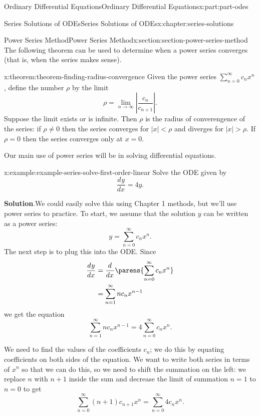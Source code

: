 \documentclass[oneside,10pt,]{book}
\newcommand{\blocktitlefont}{\relax}
\numberwithin{equation}{part}
\newcommand{\dv}[3][]{\dfrac{d^{#1} #2}{d #3^{#1}}}
\newcommand{\limit}[2]{\lim_{#1\to#2}}
\newcommand{\lt}{<}
\newcommand{\gt}{>}
\newcommand{\amp}{&}
\begin{document}
\begin{partptx}{Ordinary Differential Equations}{}{Ordinary Differential Equations}{}{}{x:part:part-odes}
\begin{chapterptx}{Series Solutions of ODEs}{}{Series Solutions of ODEs}{}{}{x:chapter:series-solutions}
\begin{sectionptx}{Power Series Method}{}{Power Series Method}{}{}{x:section:section-power-series-method}
The following theorem can be used to determine when a power series converges (that is, when the series makes sense).%
\begin{theorem}{}{}{x:theorem:theorem-finding-radius-convergence}%
Given the power series \(\sum_{n=0}^{\infty}c_{n}x^{n}\), define the number \(\rho\) by the limit%
\begin{equation*}
\rho = \limit{n}{\infty}\left|\frac{c_{n}}{c_{n+1}}\right|.
\end{equation*}
Suppose the limit exists or is infinite. Then \(\rho\) is the radius of converengence of the series: if \(\rho\neq0\) then the series converges for \(|x|\lt\rho\) and diverges for \(|x|\gt\rho\). If \(\rho=0\) then the series converges only at \(x=0\).%
\end{theorem}
Our main use of power series will be in solving differential equations.%
\begin{example}{}{x:example:example-series-solve-first-order-linear}%
Solve the ODE given by%
\begin{equation*}
\dv{y}{x} = 4y.
\end{equation*}
%
\par\smallskip%
\noindent\textbf{\blocktitlefont Solution}.\hypertarget{g:solution:idp105548781179808}{}\quad{}We could easily solve this using Chapter 1 methods, but we'll use power series to practice. To start, we assume that the solution \(y\) can be written as a power series:%
\begin{equation*}
y = \sum_{n=0}^{\infty}c_{n}x^{n}.
\end{equation*}
The next step is to plug this into the ODE. Since%
\begin{align*}
\dv{y}{x} \amp= \dv{}{x}\parens{\sum_{n=0}^{\infty}c_{n}x^{n}}\\
\amp= \sum_{n=1}^{\infty}nc_{n}x^{n-1}
\end{align*}
we get the equation%
\begin{equation*}
\sum_{n=1}^{\infty}nc_{n}x^{n-1} = 4\sum_{n=0}^{\infty}c_{n}x^{n}\text{.}
\end{equation*}
%
\par
We need to find the values of the coefficients \(c_{n}\); we do this by equating coefficients on both sides of the equation. We want to write both series in terms of \(x^{n}\) so that we can do this, so we need to shift the summation on the left: we replace \(n\) with \(n+1\) inside the sum and decrease the limit of summation \(n=1\) to \(n=0\) to get%
\begin{equation*}
\sum_{n=0}^{\infty}(n+1)c_{n+1}x^{n} = \sum_{n=0}^{\infty}4c_{n}x^{n}\text{.}

\end{equation*}
\end{example}
\end{sectionptx}
\end{chapterptx}
\end{partptx}
\end{document}
